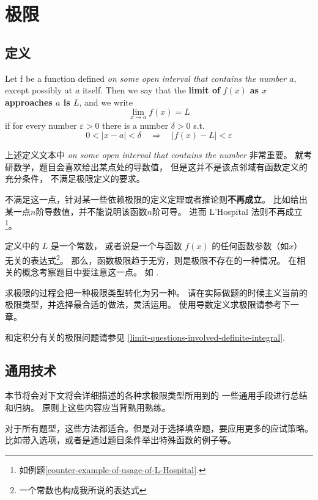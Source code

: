 \chapter{极限}
\label{section:limit}

\section{定义}
\label{def-limit}

\begin{definition}
    \label{def:limit}
    Let f be a function defined \emph{on some open interval that contains the number $a$}, 
    except possibly at $a$ itself.
    Then we say that the \textbf{limit of } $f(x)$ 
    \textbf{as $x$ approaches $a$ is $L$}, 
    and we write 
    \[
        \lim_{x \to a} f(x) = L
    \]
    if for every number $\varepsilon > 0$ there is a number $\delta > 0$ s.t.
    \[
        0 < |x - a| < \delta \quad \Rightarrow \quad |f(x) - L| < \varepsilon
    \]
\end{definition}
上述定义文本中 
\emph{on some open interval that contains the number} 非常重要。
就考研数学，题目会喜欢给出某点处的导数值，
但是这并不是该点邻域有函数定义的充分条件，
不满足极限定义的要求。

不满足这一点，针对某一些依赖极限的定义定理或者推论则\textbf{不再成立}。
比如给出某一点$n$阶导数值，并不能说明该函数$n$阶可导。
进而 L'Hospital 法则不再成立
\footnote{如例题\ref{counter-example-of-usage-of-L-Hospital}.}。

定义中的 $L$ 是一个常数，
或者说是一个与函数 $f(x)$ 的任何函数参数（如$x$）
无关的表达式\footnote{一个常数也构成我所说的表达式}。
那么，函数极限趋于无穷，则是极限不存在的一种情况。
在相关的概念考察题目中要注意这一点。
如 \cite[question 123]{w660}.

求极限的过程会把一种极限类型转化为另一种。
请在实际做题的时候主义当前的极限类型，并选择最合适的做法，灵活运用。
使用导数定义求极限请参考下一章。

和定积分有关的极限问题请参见
\ref{limit-questions-involved-definite-integral}.

\section{通用技术}

本节将会对下文将会详细描述的各种求极限类型所用到的
一些通用手段进行总结和归纳。 原则上这些内容应当背熟用熟练。

对于所有题型，这些方法都适合。但是对于选择填空题，要应用更多的应试策略。
比如带入选项，或者是通过题目条件举出特殊函数的例子等。

